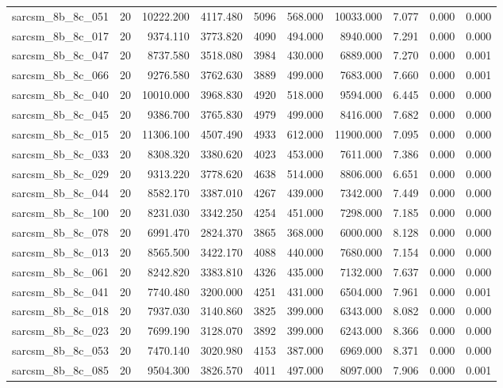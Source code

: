 \begin{tabular}{lrrrrrrrrr}
sarcsm\_8b\_8c\_051 & 20 & 10222.200 & 4117.480 & 5096 & 568.000 & 10033.000 & 7.077 & 0.000 & 0.000 \\
sarcsm\_8b\_8c\_017 & 20 & 9374.110 & 3773.820 & 4090 & 494.000 & 8940.000 & 7.291 & 0.000 & 0.000 \\
sarcsm\_8b\_8c\_047 & 20 & 8737.580 & 3518.080 & 3984 & 430.000 & 6889.000 & 7.270 & 0.000 & 0.001 \\
sarcsm\_8b\_8c\_066 & 20 & 9276.580 & 3762.630 & 3889 & 499.000 & 7683.000 & 7.660 & 0.000 & 0.001 \\
sarcsm\_8b\_8c\_040 & 20 & 10010.000 & 3968.830 & 4920 & 518.000 & 9594.000 & 6.445 & 0.000 & 0.000 \\
sarcsm\_8b\_8c\_045 & 20 & 9386.700 & 3765.830 & 4979 & 499.000 & 8416.000 & 7.682 & 0.000 & 0.000 \\
sarcsm\_8b\_8c\_015 & 20 & 11306.100 & 4507.490 & 4933 & 612.000 & 11900.000 & 7.095 & 0.000 & 0.000 \\
sarcsm\_8b\_8c\_033 & 20 & 8308.320 & 3380.620 & 4023 & 453.000 & 7611.000 & 7.386 & 0.000 & 0.000 \\
sarcsm\_8b\_8c\_029 & 20 & 9313.220 & 3778.620 & 4638 & 514.000 & 8806.000 & 6.651 & 0.000 & 0.000 \\
sarcsm\_8b\_8c\_044 & 20 & 8582.170 & 3387.010 & 4267 & 439.000 & 7342.000 & 7.449 & 0.000 & 0.000 \\
sarcsm\_8b\_8c\_100 & 20 & 8231.030 & 3342.250 & 4254 & 451.000 & 7298.000 & 7.185 & 0.000 & 0.000 \\
sarcsm\_8b\_8c\_078 & 20 & 6991.470 & 2824.370 & 3865 & 368.000 & 6000.000 & 8.128 & 0.000 & 0.000 \\
sarcsm\_8b\_8c\_013 & 20 & 8565.500 & 3422.170 & 4088 & 440.000 & 7680.000 & 7.154 & 0.000 & 0.000 \\
sarcsm\_8b\_8c\_061 & 20 & 8242.820 & 3383.810 & 4326 & 435.000 & 7132.000 & 7.637 & 0.000 & 0.000 \\
sarcsm\_8b\_8c\_041 & 20 & 7740.480 & 3200.000 & 4251 & 431.000 & 6504.000 & 7.961 & 0.000 & 0.001 \\
sarcsm\_8b\_8c\_018 & 20 & 7937.030 & 3140.860 & 3825 & 399.000 & 6343.000 & 8.082 & 0.000 & 0.000 \\
sarcsm\_8b\_8c\_023 & 20 & 7699.190 & 3128.070 & 3892 & 399.000 & 6243.000 & 8.366 & 0.000 & 0.000 \\
sarcsm\_8b\_8c\_053 & 20 & 7470.140 & 3020.980 & 4153 & 387.000 & 6969.000 & 8.371 & 0.000 & 0.000 \\
sarcsm\_8b\_8c\_085 & 20 & 9504.300 & 3826.570 & 4011 & 497.000 & 8097.000 & 7.906 & 0.000 & 0.001 \\

\end{tabular}
